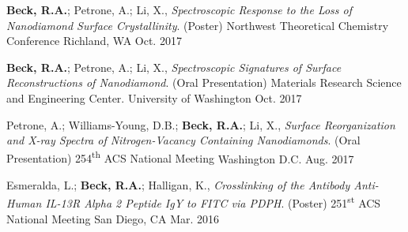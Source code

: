 \begin{cvpresentations}
\cvpresentation
{\textbf{Beck, R.A.}; Petrone, A.; Li, X., \textit{Spectroscopic Response to the Loss of Nanodiamond Surface Crystallinity}. (Poster) Northwest Theoretical Chemistry Conference}
{Richland, WA} %
{Oct. 2017} %


\cvpresentation
{\textbf{Beck, R.A.}; Petrone, A.; Li, X., \textit{Spectroscopic Signatures of Surface Reconstructions of Nanodiamond}. (Oral Presentation) Materials Research Science and Engineering Center.}
{University of Washington} %
{Oct. 2017} %


\cvpresentation
{Petrone, A.; Williams-Young, D.B.; \textbf{Beck, R.A.}; Li, X., \textit{Surface Reorganization and X-ray Spectra of Nitrogen-Vacancy Containing Nanodiamonds}. (Oral Presentation) 254\textsuperscript{th} ACS National Meeting}
{Washington D.C.} %
{Aug. 2017} %


\cvpresentation
{Esmeralda, L.; \textbf{Beck, R.A.}; Halligan, K., \textit{Crosslinking of the Antibody Anti-Human IL-13R Alpha 2 Peptide IgY to FITC via PDPH}. (Poster) 251\textsuperscript{st} ACS National Meeting}
{San Diego, CA} %
{Mar. 2016} %


\end{cvpresentations}

